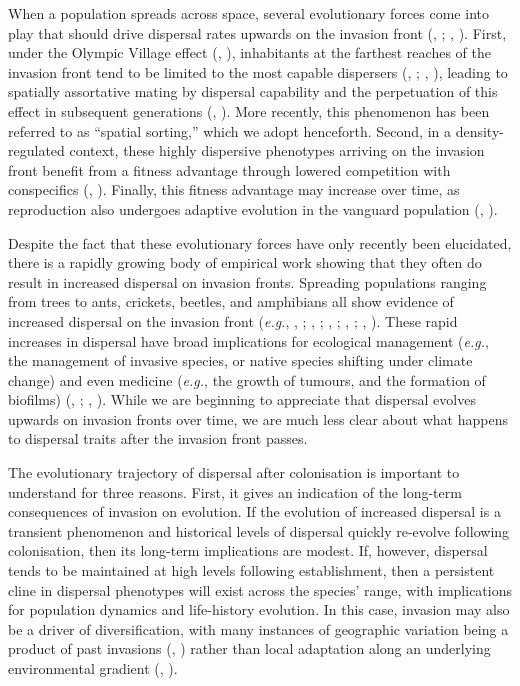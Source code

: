 \documentclass[11pt]{article}
\newcommand{\eg}{{\em e.g.}, }
\newcommand{\CiteP}[1]{(\citeauthor{#1}, \citeyear{#1})}
\newcommand{\Cite}[1]{\citeauthor{#1}, \citeyear{#1}}
\begin{document}
When a population spreads across space, several evolutionary forces come into play that should drive dispersal rates upwards on the invasion front (\Cite{Travis2002}; \Cite{Perkins2013}). First, under the Olympic Village effect \CiteP{Phillips2008a}, inhabitants at the farthest reaches of the invasion front tend to be limited to the most capable dispersers (\Cite{Shine2011a}; \Cite{Benichou2012}), leading to spatially assortative mating by dispersal capability and the perpetuation of this effect in subsequent generations \CiteP{Phillips2010}. More recently, this phenomenon has been referred to as ``spatial sorting,'' which we adopt henceforth. Second, in a density-regulated context, these highly dispersive phenotypes arriving on the invasion front benefit from a fitness advantage through lowered competition with conspecifics \CiteP{Phillips2008a}. Finally, this fitness advantage may increase over time, as reproduction also undergoes adaptive evolution in the vanguard population \CiteP{Perkins2013}.

Despite the fact that these evolutionary forces have only recently been elucidated, there is a rapidly growing body of empirical work showing that they often do result in increased dispersal on invasion fronts. Spreading populations ranging from trees to ants, crickets, beetles, and amphibians all show evidence of increased dispersal on the invasion front (\eg \Cite{Cwynar1987}; \Cite{Simmons2004c}; \Cite{Leotard2009}; \Cite{Alford2009}; \Cite{Lombaert2014}). These rapid increases in dispersal have broad implications for ecological management (\eg the management of invasive species, or native species shifting under climate change) and even medicine (\eg the growth of tumours, and the formation of biofilms) (\Cite{Orlando2013}; \Cite{VanDitmarsch2013}). While we are beginning to appreciate that dispersal evolves upwards on invasion fronts over time, we are much less clear about what happens to dispersal traits after the invasion front passes.

The evolutionary trajectory of dispersal after colonisation is important to understand for three reasons. First, it gives an indication of the long-term consequences of invasion on evolution. If the evolution of increased dispersal is a transient phenomenon and historical levels of dispersal quickly re-evolve following colonisation, then its long-term implications are modest. If, however, dispersal tends to be maintained at high levels following establishment, then a persistent cline in dispersal phenotypes will exist across the species' range, with implications for population dynamics and life-history evolution. In this case, invasion may also be a driver of diversification, with many instances of geographic variation being a product of past invasions \CiteP{Shine2011a} rather than local adaptation along an underlying environmental gradient \CiteP{Kirkpatrick1997}.
\end{document}

